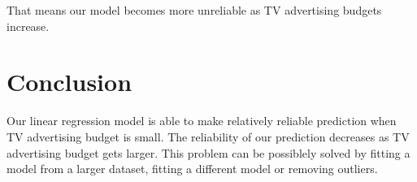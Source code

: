 \documentclass{article}
\begin{document}
\noindent
That means our model becomes more unreliable as TV advertising budgets increase.

\section{Conclusion}
Our linear regression model is able to make relatively reliable prediction when TV advertising budget is small. The reliability of our prediction decreases as TV advertising budget gets larger. This problem can be possiblely solved by fitting a model from a larger dataset, fitting a different model or removing outliers.
\end{document}
